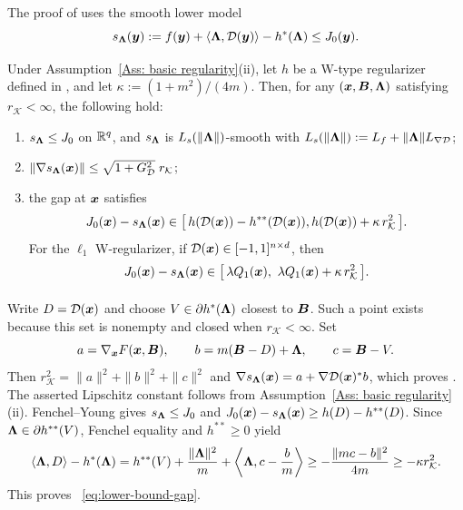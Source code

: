 \subsection{}
\label{app:original-certificate-proof}
\begingroup
\color{blue}
The proof of  uses the smooth lower model
\[
s_{\bm{\Lambda}}(\bm{y}):=f(\bm{y})+\langle\bm{\Lambda},\mathcal{D}(\bm{y})\rangle-h^*(\bm{\Lambda})\le J_0(\bm{y}).
\]
\begin{lemma}\label{lem:smooth-lower-bound}
Under Assumption~\ref{Ass: basic regularity}(ii), let $h$ be a W-type regularizer defined in , and let $\kappa:=(1+m^2)/(4m)$. Then, for any $(\bm{x},\bm{B},\bm{\Lambda})$ satisfying $r_{\mathcal{K}}<\infty$, the following hold:
\begin{enumerate}[label=\textup{(\alph*)}]
\item $s_{\bm{\Lambda}}\le J_0$ on $\mathbb{R}^q$, and $s_{\bm{\Lambda}}$ is $L_s(\|\bm{\Lambda}\|)$-smooth with $L_s(\|\bm{\Lambda}\|):=L_f+\|\bm{\Lambda}\|L_{\nabla\mathcal{D}}$;
\item $\|\nabla s_{\bm{\Lambda}}(\bm{x})\|\le\sqrt{1+G_{\mathcal{D}}^2}\;r_{\mathcal{K}}$;
\item the gap at $\bm{x}$ satisfies
\begin{equation}\label{eq:lower-bound-gap}
\begin{split}
J_0(\bx)-s_{\bLmbd}(\bx) \in\bigl[\,h(\mathcal{D}(\bx))-h^{**}(\mathcal{D}(\bx)), h(\mathcal{D}(\bx))+\kappa\,r_{\mathcal{K}}^2\,\bigr].
\end{split}
\end{equation}
For the $\ell_1$ W-regularizer, if $\mathcal{D}(\bm{x})\in[-1,1]^{n\times d}$, then
\[
J_0(\bm{x})-s_{\bm{\Lambda}}(\bm{x})\in
\bigl[\,\lambda Q_1(\bm{x}),\ \lambda Q_1(\bm{x})+\kappa\,r_{\mathcal{K}}^2\,\bigr].
\]
\end{enumerate}
\end{lemma}
\paragraph{}
Write $D=\mathcal{D}(\bm{x})$ and choose $V\in\partial h^*(\bm{\Lambda})$ closest to $\bm{B}$. Such a point exists because this set is nonempty and closed when $r_{\mathcal K}<\infty$. Set
\[
a=\nabla_{\bm{x}}F(\bm{x},\bm{B}),\qquad b=m(\bm{B}-D)+\bm{\Lambda},\qquad c=\bm{B}-V.
\]
Then $r_{\mathcal K}^2=\|a\|^2+\|b\|^2+\|c\|^2$ and
$\nabla s_{\bm{\Lambda}}(\bm{x})=a+\nabla\mathcal D(\bm{x})^*b$, which proves . The asserted Lipschitz constant follows from Assumption~\ref{Ass: basic regularity}(ii). Fenchel--Young gives $s_{\bm{\Lambda}}\le J_0$ and
$J_0(\bm{x})-s_{\bm{\Lambda}}(\bm{x})\ge h(D)-h^{**}(D)$.
Since $\bm{\Lambda}\in\partial h^{**}(V)$, Fenchel equality and $h^{**}\ge0$ yield
\[
\langle\bm{\Lambda},D\rangle-h^*(\bm{\Lambda})
=h^{**}(V)+\frac{\|\bm{\Lambda}\|^2}{m}
+\left\langle\bm{\Lambda},c-\frac{b}{m}\right\rangle
\ge-\frac{\|mc-b\|^2}{4m}
\ge-\kappa r_{\mathcal K}^2.
\]
This proves ~\eqref{eq:lower-bound-gap}. 

